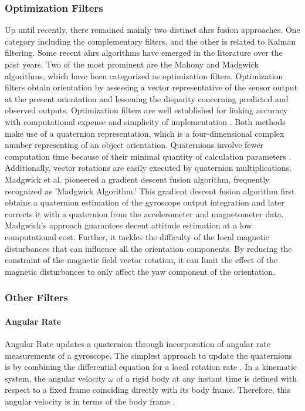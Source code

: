 \subsubsection{Optimization Filters}

Up until recently, there remained mainly two distinct \acrshort{ahrs} fusion approaches. One category including the complementary filters, and the other is related to Kalman filtering. Some recent \acrshort{ahrs} algorithms have emerged in the literature over the past years. Two of the most prominent are the Mahony and Madgwick algorithms, which have been categorized as optimization filters. Optimization filters obtain orientation by assessing a vector representative of the sensor output at the present orientation and lessening the disparity concerning predicted and observed outputs. Optimization filters are well established for linking accuracy with computational expense and simplicity of implementation \cite{madgwick2020extended}.
Both methods make use of a quaternion representation, which is a four-dimensional complex number representing of an object orientation. Quaternions involve fewer computation time because of their minimal quantity of calculation parameters \cite{ludwig2018comparison}. Additionally, vector rotations are easily executed by quaternion multiplications.
Madgwick et al. \cite{madgwick2010efficient} pioneered a gradient descent fusion algorithm, frequently recognized as 'Madgwick Algorithm.' This gradient descent fusion algorithm first obtains a quaternion estimation of the gyroscope output integration and later corrects it with a quaternion from the accelerometer and magnetometer data. Madgwick's approach guarantees decent attitude estimation at a low computational cost. Further, it tackles the difficulty of the local magnetic disturbances that can influence all the orientation components. By reducing the constraint of the magnetic field vector rotation, it can limit the effect of the magnetic disturbances to only affect the yaw component of the orientation.

\subsubsection{Other Filters}
\paragraph{Angular Rate}

Angular Rate updates a quaternion through incorporation of angular rate measurements of a gyroscope. The simplest approach to update the quaternions is by combining the differential equation for a local rotation rate \cite{sola2017quaternion}.
In a kinematic system, the angular velocity $\omega$ of a rigid body at any instant time is defined with respect to a fixed frame coinciding directly with its body frame. Therefore, this angular velocity is in terms of the body frame \cite{jia2019quaternions}.


